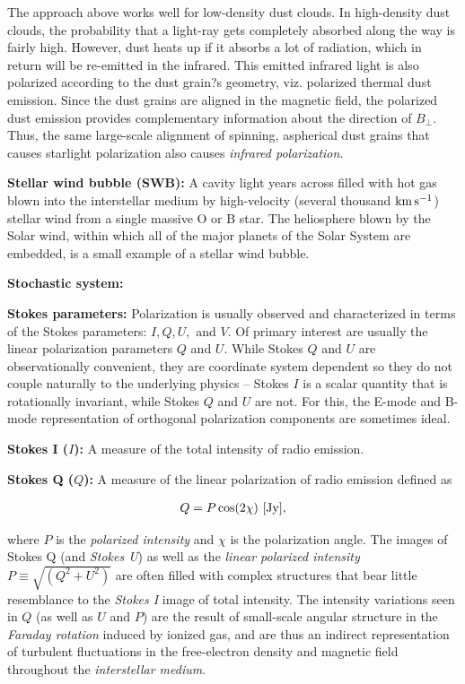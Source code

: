 \documentclass[a4paper,10pt]{article}
\begin{document}
{\noindent}The approach above works well for low-density dust clouds. In high-density dust clouds, the probability that a light-ray gets completely absorbed along the way is fairly high. However, dust heats up if it absorbs a lot of radiation, which in return will be re-emitted in the infrared. This emitted infrared light is also polarized according to the dust grain?s geometry, viz. polarized thermal dust emission. Since the dust grains are aligned in the magnetic field, the polarized dust emission provides complementary information about the direction of $B_\perp$. Thus, the same large-scale alignment of spinning, aspherical dust grains that causes starlight polarization also causes \textit{infrared polarization}.

{\noindent}\textbf{Stellar wind bubble (SWB):} A cavity light years across filled with hot gas blown into the interstellar medium by high-velocity (several thousand ${\rm km\,s^{-1}}$) stellar wind from a single massive O or B star. The heliosphere blown by the Solar wind, within which all of the major planets of the Solar System are embedded, is a small example of a stellar wind bubble.

{\noindent}\textbf{Stochastic system:}

{\noindent}\textbf{Stokes parameters:} Polarization is usually observed and characterized in terms of the Stokes parameters: $I, Q, U,$ and $V$. Of primary interest are usually the linear polarization parameters $Q$ and $U$. While Stokes $Q$ and $U$ are observationally convenient, they are coordinate system dependent so they do not couple naturally to the underlying physics -- Stokes $I$ is a scalar quantity that is rotationally invariant, while Stokes $Q$ and $U$ are not. For this, the E-mode and B- mode representation of orthogonal polarization components are sometimes ideal.

{\noindent}\textbf{Stokes I ($I$):} A measure of the total intensity of radio emission.

{\noindent}\textbf{Stokes Q ($Q$):} A measure of the linear polarization of radio emission defined as

\begin{align*}
    Q = P\cos(2\chi) ~ [{\rm Jy}],
\end{align*}

{\noindent}where $P$ is the \textit{polarized intensity} and $\chi$ is the polarization angle. The images of Stokes Q (and \textit{Stokes U}) as well as the \textit{linear polarized intensity} $P\equiv\sqrt{(Q^2+U^2)}$ are often filled with complex structures that bear little resemblance to the \textit{Stokes I} image of total intensity. The intensity variations seen in $Q$ (as well as $U$ and $P$) are the result of small-scale angular structure in the \textit{Faraday rotation} induced by ionized gas, and are thus an indirect representation of turbulent fluctuations in the free-electron density and magnetic field throughout the \textit{interstellar medium}.
\end{document}
